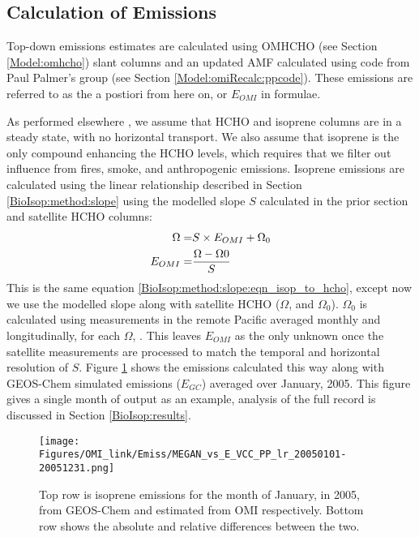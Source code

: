     
  \subsection{Calculation of Emissions}
    \label{BioIsop:method:calculation}
   
    Top-down emissions estimates are calculated using OMHCHO (see Section \ref{Model:omhcho}) slant columns and an updated AMF calculated using code from Paul Palmer's group (see Section \ref{Model:omiRecalc:ppcode}).
    These emissions are referred to as the a postiori from here on, or $E_{OMI}$ in formulae.
    
    
    As performed elsewhere \textcite[e.g.][]{Palmer2003, Millet2006, Bauwens2016}, we assume that HCHO and isoprene columns are in a steady state, with no horizontal transport.
    We also assume that isoprene is the only compound enhancing the HCHO levels, which requires that we filter out influence from fires, smoke, and anthropogenic emissions.
    Isoprene emissions are calculated using the linear relationship described in Section \ref{BioIsop:method:slope} using the modelled slope $S$ calculated in the prior section and satellite HCHO columns:
    \begin{eqnarray} \label{BioIsop:method:eqn_Enew}
      \Omega = & S \times E_{OMI} + \Omega_0 \notag \\
      E_{OMI} = & \frac{\Omega - \Omega{0}}{S}
    \end{eqnarray}
    This is the same equation \ref{BioIsop:method:slope:eqn_isop_to_hcho}, except now we use the modelled slope along with satellite HCHO ($\Omega$, and $\Omega_0$).
    $\Omega_0$ is calculated using measurements in the remote Pacific averaged monthly and longitudinally, for each $\Omega$, .
    This leaves $E_{OMI}$ as the only unknown once the satellite measurements are processed to match the temporal and horizontal resolution of $S$.
    Figure \ref{BioIsop:method:calculation:fig_E_isop_200501} shows the emissions calculated this way along with GEOS-Chem simulated emissions ($E_{GC}$) averaged over January, 2005.
    This figure gives a single month of output as an example, analysis of the full record is discussed in Section \ref{BioIsop:results}.
      
    \begin{figure}
      \texttt{[image: Figures/OMI\_link/Emiss/MEGAN\_vs\_E\_VCC\_PP\_lr\_20050101-20051231.png]}
      \caption{%
        Top row is isoprene emissions for the month of January, in 2005, from GEOS-Chem and estimated from OMI respectively.
        Bottom row shows the absolute and relative differences between the two.
      }
      \label{BioIsop:method:calculation:fig_E_isop_200501}
    \end{figure}
    
